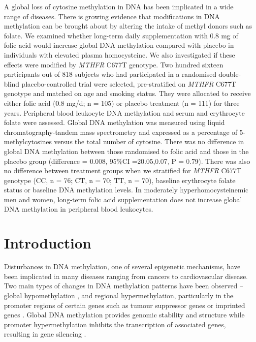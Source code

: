 \noindent A global loss of cytosine methylation in DNA has been implicated in a wide range of diseases. There is growing evidence that modifications in DNA methylation can be brought about by altering the intake of methyl donors such as folate. We examined whether long-term daily supplementation with 0.8 mg of folic acid would increase global DNA methylation compared with placebo in individuals with elevated plasma homocysteine. We also investigated if these effects were modified by \emph{MTHFR} C677T genotype. Two hundred sixteen participants out of 818 subjects who had participated in a randomised double-blind placebo-controlled trial were selected, pre-stratified on \emph{MTHFR} C677T genotype and matched on age and smoking status. They were allocated to receive either folic acid (0.8 mg/d; n = 105) or placebo treatment (n = 111) for three years. Peripheral blood leukocyte DNA methylation and serum and erythrocyte folate were assessed. Global DNA methylation was measured using liquid chromatography-tandem mass spectrometry and expressed as a percentage of 5-methylcytosines versus the total number of cytosine. There was no difference in global DNA methylation between those randomised to folic acid and those in the placebo group (difference = 0.008, 95\%CI =20.05,0.07, P = 0.79). There was also no difference between treatment groups when we stratified for \emph{MTHFR} C677T genotype (CC, n = 76; CT, n = 70; TT, n = 70), baseline erythrocyte folate status or baseline DNA methylation levels. In moderately hyperhomocysteinemic men and women, long-term folic acid supplementation does not increase global DNA methylation in peripheral blood leukocytes.

\newpage

\section[]{Introduction} %
\noindent Disturbances in DNA methylation, one of several epigenetic mechanisms, have been implicated in many diseases ranging from cancers to cardiovascular disease. Two main types of changes in DNA methylation patterns have been observed -- global hypomethylation \cite{c41}, and regional hypermethylation, particularly in the promoter regions of certain genes such as tumour suppressor genes or imprinted genes \cite{c42,c43,c44}. Global DNA methylation provides genomic stability and structure \cite{c45} while promoter hypermethylation inhibits the transcription of associated genes, resulting in gene silencing \cite{c46}.


